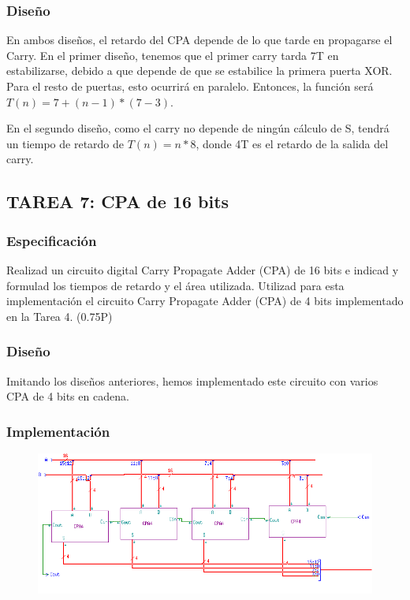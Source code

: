 \documentclass{article}
\begin{document}
		\subsubsection*{Diseño}
		En ambos diseños, el retardo del CPA depende de lo que tarde en propagarse el Carry. En el primer diseño, tenemos que el primer carry tarda 7T en estabilizarse, debido a que depende de que se estabilice la primera puerta XOR. Para el resto de puertas, esto ocurrirá en paralelo. Entonces, la función será $ T(n)=7+(n-1)*(7-3) $. 

		En el segundo diseño, como el carry no depende de ningún cálculo de S, tendrá un tiempo de retardo de $ T(n)=n*8 $, donde 4T es el retardo de la salida del carry. 

	\subsection{TAREA 7: CPA de 16 bits}
		\subsubsection*{Especificación}
		Realizad un circuito digital Carry Propagate Adder (CPA) de 16 bits e indicad y
		formulad los tiempos de retardo y el área utilizada. Utilizad para esta implementación el circuito
		Carry Propagate Adder (CPA) de 4 bits implementado en la Tarea 4. (0.75P)

		\subsubsection*{Diseño}
		Imitando los diseños anteriores, hemos implementado este circuito con varios CPA de 4 bits en cadena.

		\subsubsection*{Implementación}
		 \begin{figure}[ht]
			\includegraphics[width=0.8\linewidth]{CPA16}
		 	\centering
		 \end{figure}
\end{document}
